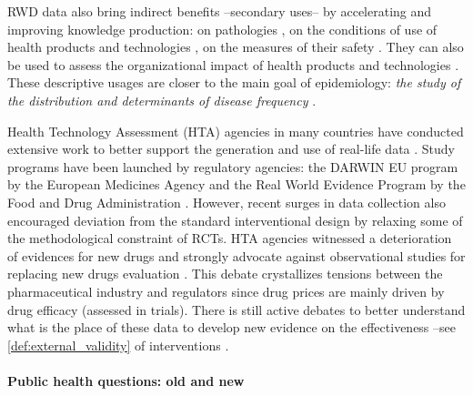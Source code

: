\documentclass[french,12pt,twoside,a4paper]{book}
\begin{document}
RWD data also bring indirect benefits --secondary uses-- by accelerating and
improving knowledge production: on pathologies
\citep{campbell_characterizing_2022}, on the conditions of use of health
products and technologies \citep{safran_toward_2007,tuppin_value_2017}, on the
measures of their safety \citep{wisniewski_development_2003}. They can also be
used to assess the organizational impact of health products and technologies
\citep{has_guide_2020,has_real-world_2021}. These descriptive usages are closer
to the main goal of epidemiology: \textit{the study of the distribution
  and determinants of disease frequency} \citep{macmahon1970epidemiology}.

Health Technology Assessment (HTA) agencies in many countries have conducted
extensive work to better support the generation and use of real-life data
\citep{has_real-world_2021,kent_nice_2022,plamondongenevieve_integration_2022,fda_real-world_2021}.
Study programs have been launched by regulatory agencies: the DARWIN EU program
by the European Medicines Agency and the Real World Evidence Program by the Food
and Drug Administration \citep{fda_real_2018}. However, recent surges in data
collection also encouraged deviation from the standard interventional design by
relaxing some of the methodological constraint of RCTs. HTA agencies witnessed a
deterioration of evidences for new drugs and strongly advocate against
observational studies for replacing new drugs evaluation
\citep{wieseler2023replacing,vanier2023rapid}. This debate crystallizes tensions
between the pharmaceutical industry and regulators since drug prices are
mainly driven by drug efficacy (assessed in trials).
%
There is still active debates to better understand what is the place of these
data to develop new evidence on the effectiveness --see
\ref{def:external_validity} of interventions \citep{richesson_electronic_2013}
.

\paragraph{Public health questions: old and new}
\end{document}
